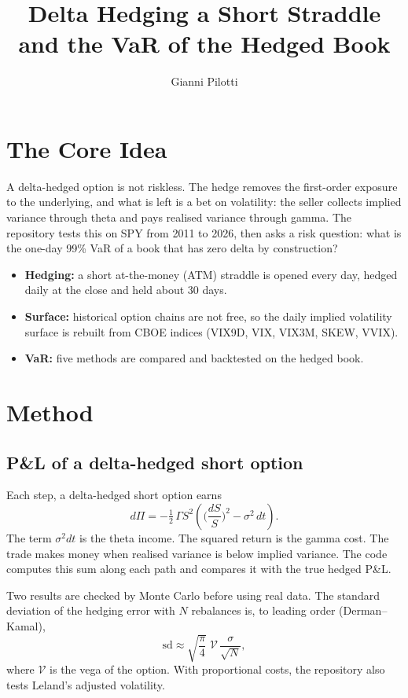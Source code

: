 \documentclass[11pt,a4paper]{article}
\title{Delta Hedging a Short Straddle\\and the VaR of the Hedged Book}
\author{Gianni Pilotti}
\date{}
\begin{document}
\maketitle

\section{The Core Idea}
A delta-hedged option is not riskless. The hedge removes the first-order exposure to the underlying, and what is left is a bet on volatility: the seller collects implied variance through theta and pays realised variance through gamma. The repository tests this on SPY from 2011 to 2026, then asks a risk question: what is the one-day 99\% VaR of a book that has zero delta by construction?

\begin{itemize}
\item \textbf{Hedging:} a short at-the-money (ATM) straddle is opened every day, hedged daily at the close and held about 30 days.
\item \textbf{Surface:} historical option chains are not free, so the daily implied volatility surface is rebuilt from CBOE indices (VIX9D, VIX, VIX3M, SKEW, VVIX).
\item \textbf{VaR:} five methods are compared and backtested on the hedged book.
\end{itemize}

\section{Method}
\subsection{P\&L of a delta-hedged short option}
Each step, a delta-hedged short option earns
\[
d\Pi=-\tfrac12\,\Gamma S^2\left(\Big(\frac{dS}{S}\Big)^2-\sigma^2\,dt\right).
\]
The term $\sigma^2dt$ is the theta income. The squared return is the gamma cost. The trade makes money when realised variance is below implied variance. The code computes this sum along each path and compares it with the true hedged P\&L.

Two results are checked by Monte Carlo before using real data. The standard deviation of the hedging error with $N$ rebalances is, to leading order (Derman--Kamal),
\[
\mathrm{sd}\approx\sqrt{\frac{\pi}{4}}\;\mathcal{V}\,\frac{\sigma}{\sqrt N},
\]
where $\mathcal{V}$ is the vega of the option. With proportional costs, the repository also tests Leland's adjusted volatility.
\end{document}
